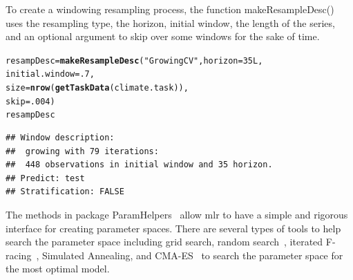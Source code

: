 \documentclass[12pt]{article}\usepackage[]{graphicx}\usepackage[]{color}
\makeatletter
\newcommand{\hlnum}[1]{\textcolor[rgb]{0.686,0.059,0.569}{#1}}%
\newcommand{\hlstr}[1]{\textcolor[rgb]{0.192,0.494,0.8}{#1}}%
\newcommand{\hlstd}[1]{\textcolor[rgb]{0.345,0.345,0.345}{#1}}%
\newcommand{\hlkwb}[1]{\textcolor[rgb]{0.69,0.353,0.396}{#1}}%
\newcommand{\hlkwc}[1]{\textcolor[rgb]{0.333,0.667,0.333}{#1}}%
\newcommand{\hlkwd}[1]{\textcolor[rgb]{0.737,0.353,0.396}{\textbf{#1}}}%
\newenvironment{kframe}{%
 \def\at@end@of@kframe{}%
 \ifinner\ifhmode%
  \def\at@end@of@kframe{\end{minipage}}%
  \begin{minipage}{\columnwidth}%
 \fi\fi%
 \def\FrameCommand##1{\hskip\@totalleftmargin \hskip-\fboxsep
 \colorbox{shadecolor}{##1}\hskip-\fboxsep
     \hskip-\linewidth \hskip-\@totalleftmargin \hskip\columnwidth}%
 \MakeFramed {\advance\hsize-\width
   \@totalleftmargin\z@ \linewidth\hsize
   \@setminipage}}%
 {\par\unskip\endMakeFramed%
 \at@end@of@kframe}
\newenvironment{knitrout}{}{} %
\theoremstyle{definition}
\newcommand\code{\@codex}
\def\@codex#1{{\normalfont\ttfamily\hyphenchar\font=-1 #1}}
\newcommand{\pkg}[1]{{\fontseries{b}\selectfont #1}}
\makeatother
\begin{document}
To create a windowing resampling process, the function \code{makeResampleDesc()} uses the resampling type, the horizon, initial window, the length of the series, and an optional argument to skip over some windows for the sake of time.

\singlespacing
\begin{knitrout}
\color{fgcolor}\begin{kframe}
\begin{alltt}
\hlstd{resampDesc} \hlkwb{=} \hlkwd{makeResampleDesc}\hlstd{(}\hlstr{"GrowingCV"}\hlstd{,} \hlkwc{horizon} \hlstd{=} \hlnum{35L}\hlstd{,}
                          \hlkwc{initial.window} \hlstd{=} \hlnum{.7}\hlstd{,}
                          \hlkwc{size} \hlstd{=} \hlkwd{nrow}\hlstd{(}\hlkwd{getTaskData}\hlstd{(climate.task)),}
                          \hlkwc{skip} \hlstd{=} \hlnum{.004}\hlstd{)}
\hlstd{resampDesc}
\end{alltt}
\begin{verbatim}
## Window description:
##  growing with 79 iterations:
##  448 observations in initial window and 35 horizon.
## Predict: test
## Stratification: FALSE
\end{verbatim}
\end{kframe}
\end{knitrout}
\doublespacing

The methods in package \pkg{ParamHelpers}~\cite{paramhelper} allow \pkg{mlr} to have a simple and rigorous interface for creating parameter spaces. There are several types of tools to help search the parameter space including grid search, random search~\cite{Bergstra}, iterated F-racing~\cite{irace}, Simulated Annealing, and CMA-ES~\cite{cmaes}  to search the parameter space for the most optimal model.
\end{document}
